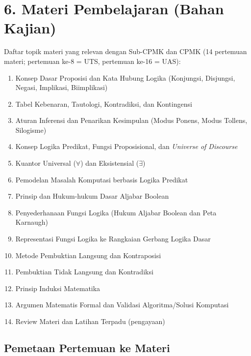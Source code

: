 \documentclass[12pt,a4paper]{article}
\begin{document}
\vspace{0.5cm}

\section*{6. Materi Pembelajaran (Bahan Kajian)}

Daftar topik materi yang relevan dengan Sub-CPMK dan CPMK (14 pertemuan materi; pertemuan ke-8 = UTS, pertemuan ke-16 = UAS):

\begin{enumerate}[leftmargin=*]
  \item Konsep Dasar Proposisi dan Kata Hubung Logika (Konjungsi, Disjungsi, Negasi, Implikasi, Biimplikasi)
  \item Tabel Kebenaran, Tautologi, Kontradiksi, dan Kontingensi
  \item Aturan Inferensi dan Penarikan Kesimpulan (Modus Ponens, Modus Tollens, Silogisme)
  \item Konsep Logika Predikat, Fungsi Proposisional, dan \textit{Universe of Discourse}
  \item Kuantor Universal ($\forall$) dan Eksistensial ($\exists$)
  \item Pemodelan Masalah Komputasi berbasis Logika Predikat
  \item Prinsip dan Hukum-hukum Dasar Aljabar Boolean
  \item Penyederhanaan Fungsi Logika (Hukum Aljabar Boolean dan Peta Karnaugh)
  \item Representasi Fungsi Logika ke Rangkaian Gerbang Logika Dasar
  \item Metode Pembuktian Langsung dan Kontraposisi
  \item Pembuktian Tidak Langsung dan Kontradiksi
  \item Prinsip Induksi Matematika
  \item Argumen Matematis Formal dan Validasi Algoritma/Solusi Komputasi
  \item Review Materi dan Latihan Terpadu (pengayaan)
\end{enumerate}

\subsection*{Pemetaan Pertemuan ke Materi}
\end{document}
